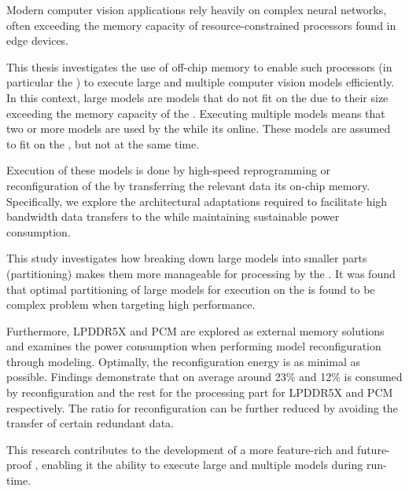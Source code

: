Modern computer vision applications rely heavily on complex neural networks, often exceeding the memory capacity of resource-constrained processors found in edge devices.

This thesis investigates the use of off-chip memory to enable such processors (in particular the \graicore{}) to execute large and multiple computer vision models efficiently.
In this context, large models are models that do not fit on the \graicore{} due to their size exceeding the memory capacity of the \graicore{}.
Executing multiple models means that two or more models are used by the \graicore{} while its online.
These models are assumed to fit on the \graicore{}, but not at the same time.

Execution of these models is done by high-speed reprogramming or reconfiguration of the \graicore{} by transferring the relevant data its on-chip memory.
Specifically, we explore the architectural adaptations required to facilitate high bandwidth data transfers to the \graicore{} while maintaining sustainable power consumption.

This study investigates how breaking down large models into smaller parts (partitioning) makes them more manageable for processing by the \graicore{}.
It was found that optimal partitioning of large models for execution on the \graicore{} is found to be complex problem when targeting high performance.

Furthermore, LPDDR5X and PCM are explored as external memory solutions and examines the power consumption when performing model reconfiguration through modeling.
Optimally, the reconfiguration energy is as minimal as possible.
Findings demonstrate that on average around 23\% and 12\% is consumed by reconfiguration and the rest for the processing part for LPDDR5X and PCM respectively.
The ratio for reconfiguration can be further reduced by avoiding the transfer of certain redundant data.

This research contributes to the development of a more feature-rich and future-proof \graicore{}, enabling it the ability to execute large and multiple models during run-time.
